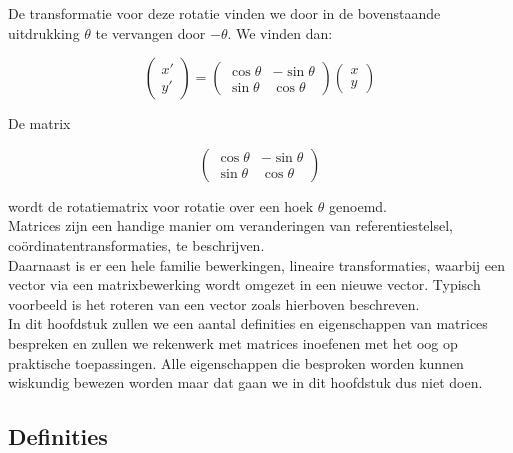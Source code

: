 
De transformatie voor deze rotatie vinden we door in de bovenstaande uitdrukking $\theta$ te vervangen door $-\theta$. We vinden dan:

\[
\left( \begin{array}{l} x' \\ y' \end{array} \right)= \left( \begin{array}{rr} \cos \theta & -\sin \theta \\ \sin \theta & \cos \theta \end{array} \right) \left( \begin{array}{l} x \\ y \end{array} \right) 
\]

De matrix

\[
\left( \begin{array}{rr} \cos \theta & -\sin \theta \\ \sin \theta & \cos \theta \end{array} \right)
\]

wordt de rotatiematrix voor rotatie over een hoek $\theta$ genoemd.\\

Matrices zijn een handige manier om veranderingen van referentiestelsel, co\"{o}rdinatentransformaties, te beschrijven.\\
Daarnaast is er een hele familie bewerkingen, lineaire transformaties, waarbij een vector via een matrixbewerking wordt omgezet in een nieuwe vector. Typisch voorbeeld is het roteren van een vector zoals hierboven beschreven.\\

In dit hoofdstuk zullen we een aantal definities en eigenschappen van matrices bespreken en zullen we rekenwerk met matrices inoefenen met het oog op praktische toepassingen. Alle eigenschappen die besproken worden kunnen wiskundig bewezen worden maar dat gaan we in dit hoofdstuk dus niet doen.\\

\newpage

\subsection{Definities}

